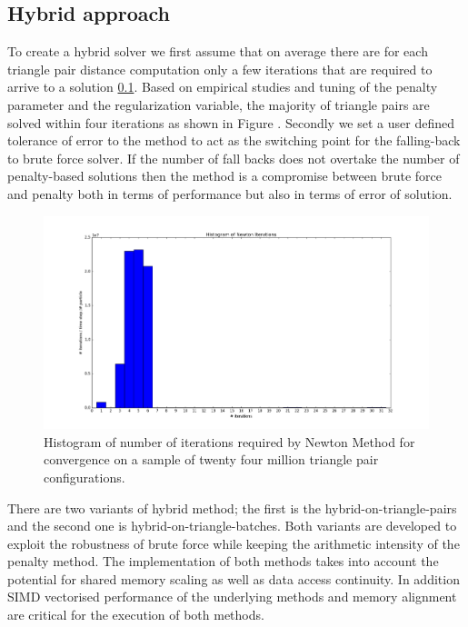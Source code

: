 \subsection{Hybrid approach}
To create a hybrid solver we first assume that on average there are for each triangle pair distance computation only a few iterations that are required to arrive to a solution \ref{}. Based on empirical studies and tuning of the penalty parameter and the regularization variable, the majority of triangle pairs are solved within four iterations as shown in Figure {}. Secondly we set a user defined tolerance of error to the method to act as the switching point for the falling-back to brute force solver. If the number of fall backs does not overtake the number of penalty-based solutions then the method is a compromise between brute force and penalty both in terms of performance but also in terms of error of solution. 

\begin{figure}[htb]
  \begin{center}
    \includegraphics[width=1\textwidth]{experiments/random/penalty-stats/bar.png}
  \end{center}
  \caption{Histogram of number of iterations required by Newton Method for convergence on a sample of twenty four million triangle pair configurations.}
  \label{figure:newton_hist}
\end{figure}

There are two variants of hybrid method; the first is the hybrid-on-triangle-pairs and the second one is hybrid-on-triangle-batches. Both variants are developed to exploit the robustness of brute force while keeping the arithmetic intensity of the penalty method. The implementation of both methods takes into account the potential for shared memory scaling as well as data access continuity. In addition SIMD vectorised performance of the underlying methods and memory alignment are critical for the execution of both methods.

